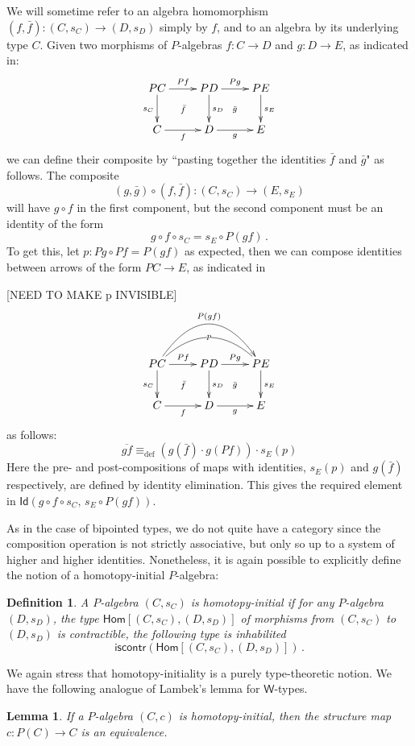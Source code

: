 \documentclass[10pt,a4paper,oneside,reqno]{amsart}
\numberwithin{equation}{section}
\theoremstyle{mythm}
\newtheorem{lemma}[theorem]{Lemma}
\theoremstyle{mydef}
\newtheorem{definition}[theorem]{Definition}
\theoremstyle{myrmk}
\newcommand{\ie}{\text{i.e.\ }}
\newcommand{\deq}{\equiv}
\newcommand{\defeq}{\deq_{\mathrm{def}}}
\newcommand{\co}{\colon}
\newcommand{\iscontr}{\mathsf{iscontr}}
\newcommand{\Id}{\mathsf{Id}}
\newcommand{\W}{\mathsf{W}}
\newcommand{\Hom}{\mathsf{Hom}}
\begin{document}
We will sometime refer to an algebra homomorphism $(f, \bar{f}) : (C, s_C) \rightarrow (D, s_D)$ simply by $f$, and to an algebra by its underlying type $C$.
Given two morphisms of $P$-algebras $f \co C \to D$ and $g \co D \to E$, as indicated in:
\[
\xymatrix{
 PC \ar[d]_{s_C} \ar[r]^{Pf}  \ar@{}[dr]|{\bar{f}} &  PD \ar[d]^{s_D}  \ar[r]^{Pg}  \ar@{}[dr]|{\bar{g}} &  PE \ar[d]^{s_E} \\
C \ar[r]_{f}   & D \ar[r]_{g}   & E }
\]
we can define their composite by ``pasting together the identities $\bar{f}$ and $\bar{g}$" as follows.
The composite $$(g, \bar{g}) \circ (f, \bar{f}) \co (C,s_C) \to (E,s_E)$$ will have $g\circ f$ in the first component, but the second component must be an identity of the form
\[
g\circ f\circ s_C = s_E\circ P(gf)\, .
\]
To get this, let $p : Pg\circ Pf = P(gf)$ as expected, then we can compose identities between arrows of the form $PC \to E$, as indicated in

[NEED TO MAKE p INVISIBLE]
\[
\xymatrix{
 PC \ar[d]_{s_C} \ar[r]^{Pf}  \ar@{}[dr]|{\bar{f}} \ar@{}@/^2pc/[rr]|{p} \ar@/^3pc/[rr]^{P(gf)} &  PD \ar[d]^{s_D}  \ar[r]^{Pg}  \ar@{}[dr]|{\bar{g}} &  PE \ar[d]^{s_E} \\
C \ar[r]_{f}   & D \ar[r]_{g}   & E }
\]
as follows:
\[
\overline{gf} \defeq (g(\bar{f})\cdot g(Pf))\cdot s_E(p)
\]
Here the pre- and post-compositions of maps with identities, $s_E(p)$ and $g(\bar{f})$ respectively, are defined by identity elimination.
This gives the required  element in $\Id(g\circ f\circ s_C ,\, s_E\circ P(gf))$.

As in the case of bipointed types, we do not quite have a category since the composition operation is not strictly associative, but only so up to a system of higher and higher identities. 
Nonetheless, it is again possible to explicitly define the notion of a homotopy-initial $P$-algebra:

\begin{definition}\label{def:AlgInit}
A $P$-algebra $(C, s_C)$ is  \emph{homotopy-initial}  if for any $P$-algebra $(D,s_D)$, the type $\Hom[(C, s_C),(D,s_D)]$ of morphisms from $(C, s_C)$ to $(D,s_D)$
is contractible, \ie the following type is inhabilited
\[
 \iscontr(\Hom[(C, s_C),(D,s_D)]) \, .
\]  
\end{definition}

We again stress that homotopy-initiality is a purely type-theoretic notion. We have the following analogue of Lambek's lemma for $\W$-types.


\begin{lemma}\label{lem:IntLambek}
If a $P$-algebra $(C,c)$ is homotopy-initial, then the structure map $c \co P(C) \to C$ is an equivalence.
\end{lemma}
\end{document}
